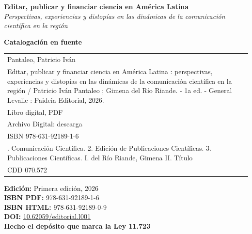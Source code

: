 
\newcommand{\isbnhtml}{978-631-92189-0-9}
\newcommand{\isbnpdf}{978-631-92189-1-6}
\newcommand{\fechacierre}{16/11/2026}

\thispagestyle{empty}

\vspace*{2cm}

\begin{center}
\textbf{\Large Editar, publicar y financiar ciencia en América Latina}\\[0.5em]
\textit{\large Perspectivas, experiencias y distopías en las dinámicas de la comunicación científica en la región}\\[2em]
\end{center}

\noindent\textbf{Catalogación en fuente}\\[0.5em]

\begin{small}
\begin{tabular}{|p{12cm}|}
\hline
Pantaleo, Patricio Iván \\
\quad Editar, publicar y financiar ciencia en América Latina : perspectivas, experiencias y distopías en las dinámicas de la comunicación científica en la región / Patricio Iván Pantaleo ; Gimena del Río Riande. - 1a ed. - General Levalle : Paideia Editorial, 2026. \\
\quad Libro digital, PDF \\[0.5em]
\quad Archivo Digital: descarga \\
\quad ISBN \isbnpdf \\[0.5em]
\quad 1. Comunicación Científica. 2. Edición de Publicaciones Científicas. 3. Publicaciones Científicas. I. del Río Riande, Gimena II. Título \\
\quad CDD 070.572 \\
\hline
\end{tabular}
\end{small}

\vspace{1cm}

\noindent\textbf{Edición:} Primera edición, 2026\\
\textbf{ISBN PDF:} \isbnpdf\\
\textbf{ISBN HTML:} \isbnhtml\\
\textbf{DOI:} \href{https://doi.org/10.62059/editorial.l001}{10.62059/editorial.l001}\\
\textbf{Hecho el depósito que marca la Ley 11.723}\\[1em]

